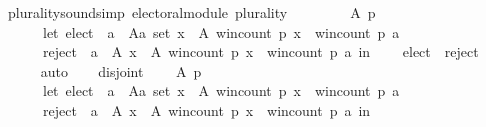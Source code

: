 \begin{isabellebody}
%
\isatagdocument
%
\isamarkuptrue%
%
\endisatagdocument
{\isafolddocument}%
%
\isadelimdocument
%
\endisadelimdocument
{}\isamarkupfalse%
\ plurality{\isacharunderscore}{\kern0pt}sound{\isacharbrackleft}{\kern0pt}simp{\isacharbrackright}{\kern0pt}{\isacharcolon}{\kern0pt}\ {\isachardoublequoteopen}electoral{\isacharunderscore}{\kern0pt}module\ plurality{\isachardoublequoteclose}\isanewline
%
\isadelimproof
%
\endisadelimproof
%
\isatagproof
{}\isamarkupfalse%
\ {\isacharminus}{\kern0pt}\isanewline
\ \ \isamarkupfalse%
\isanewline
\ \ \ \ {\isachardoublequoteopen}{\isasymforall}A\ p{\isachardot}{\kern0pt}\isanewline
\ \ \ \ \ \ let\ elect\ {\isacharequal}{\kern0pt}\ {\isacharbraceleft}{\kern0pt}a\ {\isasymin}\ {\isacharparenleft}{\kern0pt}A{\isacharcolon}{\kern0pt}{\isacharcolon}{\kern0pt}{\isacharprime}{\kern0pt}a\ set{\isacharparenright}{\kern0pt}{\isachardot}{\kern0pt}\ {\isasymforall}x\ {\isasymin}\ A{\isachardot}{\kern0pt}\ win{\isacharunderscore}{\kern0pt}count\ p\ x\ {\isasymle}\ win{\isacharunderscore}{\kern0pt}count\ p\ a{\isacharbraceright}{\kern0pt}{\isacharsemicolon}{\kern0pt}\isanewline
\ \ \ \ \ \ reject\ {\isacharequal}{\kern0pt}\ {\isacharbraceleft}{\kern0pt}a\ {\isasymin}\ A{\isachardot}{\kern0pt}\ {\isasymexists}x\ {\isasymin}\ A{\isachardot}{\kern0pt}\ win{\isacharunderscore}{\kern0pt}count\ p\ x\ {\isachargreater}{\kern0pt}\ win{\isacharunderscore}{\kern0pt}count\ p\ a{\isacharbraceright}{\kern0pt}\ in\isanewline
\ \ \ \ elect\ {\isasyminter}\ reject\ {\isacharequal}{\kern0pt}\ {\isacharbraceleft}{\kern0pt}{\isacharbraceright}{\kern0pt}{\isachardoublequoteclose}\isanewline
\ \ \ \ \isamarkupfalse%
\ auto\isanewline
\ \ \isamarkupfalse%
\ disjoint{\isacharcolon}{\kern0pt}\isanewline
\ \ \ \ {\isachardoublequoteopen}{\isasymforall}A\ p{\isachardot}{\kern0pt}\isanewline
\ \ \ \ \ \ let\ elect\ {\isacharequal}{\kern0pt}\ {\isacharbraceleft}{\kern0pt}a\ {\isasymin}\ {\isacharparenleft}{\kern0pt}A{\isacharcolon}{\kern0pt}{\isacharcolon}{\kern0pt}{\isacharprime}{\kern0pt}a\ set{\isacharparenright}{\kern0pt}{\isachardot}{\kern0pt}\ {\isasymforall}x\ {\isasymin}\ A{\isachardot}{\kern0pt}\ win{\isacharunderscore}{\kern0pt}count\ p\ x\ {\isasymle}\ win{\isacharunderscore}{\kern0pt}count\ p\ a{\isacharbraceright}{\kern0pt}{\isacharsemicolon}{\kern0pt}\isanewline
\ \ \ \ \ \ reject\ {\isacharequal}{\kern0pt}\ {\isacharbraceleft}{\kern0pt}a\ {\isasymin}\ A{\isachardot}{\kern0pt}\ {\isasymexists}x\ {\isasymin}\ A{\isachardot}{\kern0pt}\ win{\isacharunderscore}{\kern0pt}count\ p\ x\ {\isachargreater}{\kern0pt}\ win{\isacharunderscore}{\kern0pt}count\ p\ a{\isacharbraceright}{\kern0pt}\ in\isanewline

\end{isabellebody}
